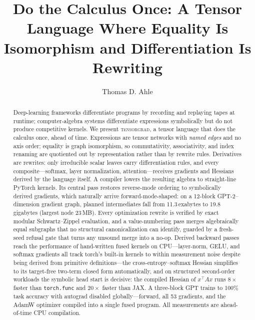 \documentclass[sigplan,10pt,review]{acmart}
\begin{document}
\title{Do the Calculus Once: A Tensor Language Where Equality Is
  Isomorphism and Differentiation Is Rewriting}

\author{Thomas D. Ahle}
\affiliation{\institution{}\country{}}

\begin{abstract}
Deep-learning frameworks differentiate programs by recording and replaying
tapes at runtime; computer-algebra systems differentiate expressions
symbolically but do not produce competitive kernels. We present
\textsc{tensorgrad}, a tensor language that does the calculus once,
ahead of time. Expressions are tensor networks with \emph{named edges} and
no axis order; equality is graph isomorphism, so commutativity,
associativity, and index renaming are quotiented out by representation
rather than by rewrite rules. Derivatives are rewrites: only irreducible
scalar leaves carry differentiation rules, and every composite---softmax,
layer normalization, attention---receives gradients and Hessians derived by
the language itself. A compiler lowers the resulting algebra to
straight-line PyTorch kernels. Its central pass restores reverse-mode
ordering to symbolically derived gradients, which naturally arrive
forward-mode-shaped: on a 12-block GPT-2--dimension gradient graph, planned
intermediates fall from 11.3\,exabytes to 19.8\,gigabytes (largest node
23\,MB). Every optimization rewrite is verified by exact modular
Schwartz--Zippel evaluation, and a value-numbering pass merges
algebraically equal subgraphs that no structural canonicalization can
identify, guarded by a fresh-seed refusal gate that turns any unsound merge
into a no-op. Derived backward passes reach the performance of
hand-written fused kernels on CPU---layer-norm, GELU, and softmax
gradients all track torch's built-in kernels to within measurement noise
despite being derived from primitive definitions---the
cross-entropy--softmax Hessian simplifies to its target-free two-term
closed form automatically, and on structured second-order workloads the
symbolic head start is decisive: the compiled Hessian of $x^{\top}Ax$
runs $8\times$ faster than \texttt{torch.func} and $20\times$ faster than
JAX. A three-block GPT
trains to 100\% task accuracy with autograd disabled globally---forward,
all 53 gradients, and the AdamW optimizer compiled into a single fused
program. All measurements are ahead-of-time CPU compilation.
\end{abstract}

\maketitle
\end{document}
